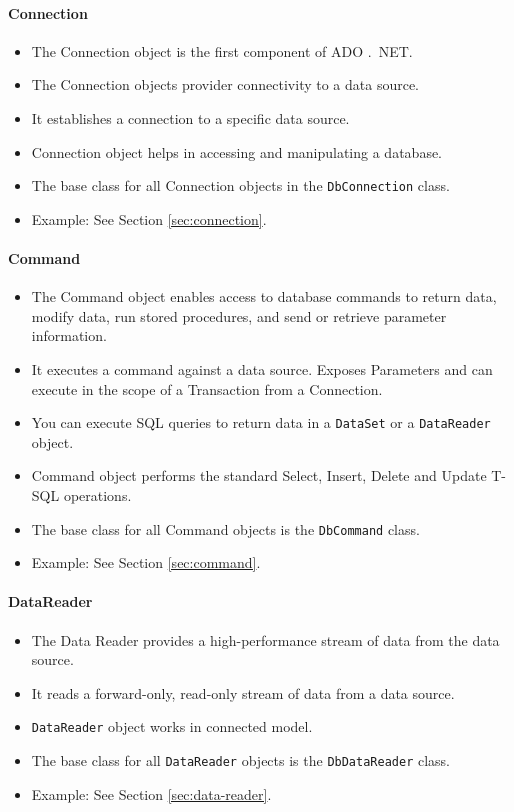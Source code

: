 \paragraph*{Connection}
\begin{itemize}
	\item The Connection object is the first component of ADO .\ NET.
	\item The Connection objects provider connectivity to a data source.
	\item It establishes a connection to a specific data source.
	\item Connection object helps in accessing and manipulating a database.
	\item The base class for all Connection objects in the \texttt{DbConnection} class.
	\item Example: See Section \ref{sec:connection}.
\end{itemize}

\paragraph*{Command}
\begin{itemize}
	\item The Command object enables access to database commands to return data, modify data, run stored procedures, and send or retrieve parameter information.
	\item It executes a command against a data source. Exposes Parameters and can execute in the scope of a Transaction from a Connection.
	\item You can execute SQL queries to return data in a \texttt{DataSet} or a \texttt{DataReader} object.
	\item Command object performs the standard Select, Insert, Delete and Update T-SQL operations.
	\item The base class for all Command objects is the \texttt{DbCommand} class.
	\item Example: See Section \ref{sec:command}.
\end{itemize}

\paragraph*{DataReader}
\begin{itemize}
	\item The Data Reader provides a high-performance stream of data from the data source.
	\item It reads a forward-only, read-only stream of data from a data source.
	\item \texttt{DataReader} object works in connected model.
	\item The base class for all \texttt{DataReader} objects is the \texttt{DbDataReader} class.
	\item Example: See Section \ref{sec:data-reader}.
\end{itemize}

